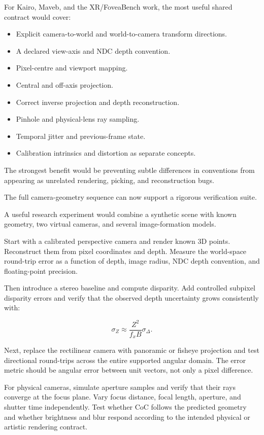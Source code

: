 For Kairo, Maveb, and the XR/FoveaBench work, the most useful shared contract would cover:

\begin{itemize}
\tightlist
\item
  Explicit camera-to-world and world-to-camera transform directions.
\item
  A declared view-axis and NDC depth convention.
\item
  Pixel-centre and viewport mapping.
\item
  Central and off-axis projection.
\item
  Correct inverse projection and depth reconstruction.
\item
  Pinhole and physical-lens ray sampling.
\item
  Temporal jitter and previous-frame state.
\item
  Calibration intrinsics and distortion as separate concepts.
\end{itemize}

The strongest benefit would be preventing subtle differences in conventions from appearing as unrelated rendering, picking, and reconstruction bugs.

The full camera-geometry sequence can now support a rigorous verification suite.

A useful research experiment would combine a synthetic scene with known geometry, two virtual cameras, and several image-formation models.

Start with a calibrated perspective camera and render known 3D points. Reconstruct them from pixel coordinates and depth. Measure the world-space round-trip error as a function of depth, image radius, NDC depth convention, and floating-point precision.

Then introduce a stereo baseline and compute disparity. Add controlled subpixel disparity errors and verify that the observed depth uncertainty grows consistently with:

\[ \boxed{ \sigma_Z\approx\frac{Z^2}{f_xB}\sigma_\Delta. } \]

Next, replace the rectilinear camera with panoramic or fisheye projection and test directional round-trips across the entire supported angular domain. The error metric should be angular error between unit vectors, not only a pixel difference.

For physical cameras, simulate aperture samples and verify that their rays converge at the focus plane. Vary focus distance, focal length, aperture, and shutter time independently. Test whether CoC follows the predicted geometry and whether brightness and blur respond according to the intended physical or artistic rendering contract.


